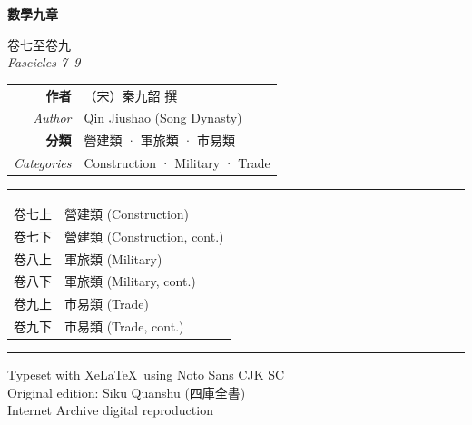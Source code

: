 \documentclass[11pt,a4paper]{article}
\providecommand{\XeLaTeX}{XeLaTeX}
\newcommand{\shortline}{\noindent\rule{0.5\textwidth}{0.4pt}\par}
\begin{document}
\begin{titlepage}
\centering
\vspace*{2cm}

{\fontsize{28}{36}\selectfont\color{titlecolor}
\textbf{數學九章}
}

\vspace{1.5cm}

{\fontsize{16}{20}\selectfont\color{sectioncolor}
卷七至卷九\\[0.5em]
\textit{Fascicles 7--9}
}

\vspace{2cm}

{\large
\begin{tabular}{rl}
\textbf{作者} & （宋）秦九韶 撰 \\
\textit{Author} & Qin Jiushao (Song Dynasty) \\
\textbf{分類} & 營建類 · 軍旅類 · 市易類 \\
\textit{Categories} & Construction · Military · Trade \\
\end{tabular}
}

\vspace{3cm}

\shortline

\vspace{1cm}

{\large
\begin{tabular}{ll}
卷七上 & 營建類 (Construction) \\
卷七下 & 營建類 (Construction, cont.) \\
卷八上 & 軍旅類 (Military) \\
卷八下 & 軍旅類 (Military, cont.) \\
卷九上 & 市易類 (Trade) \\
卷九下 & 市易類 (Trade, cont.) \\
\end{tabular}
}

\vspace{2cm}

{\color{rulecolor}\rule{0.6\textwidth}{0.6pt}}

\vspace{0.5cm}

{\small\color{sectioncolor}
Typeset with \XeLaTeX\ using Noto Sans CJK SC\\
Original edition: Siku Quanshu (四庫全書)\\
Internet Archive digital reproduction
}

\end{titlepage}
\end{document}
